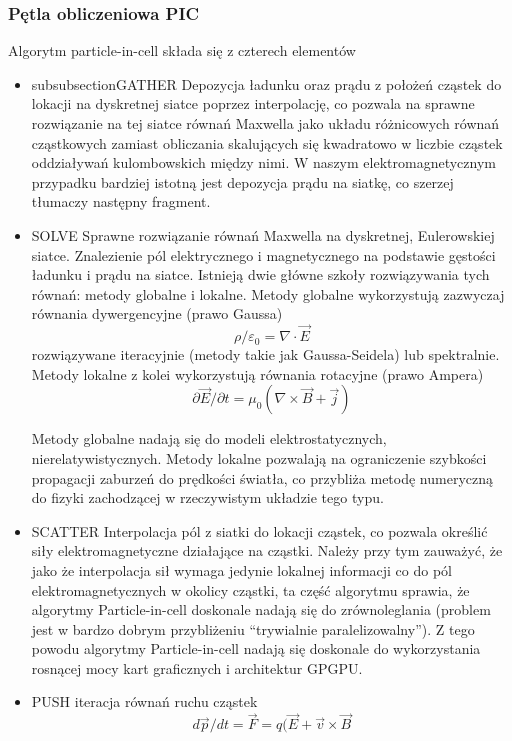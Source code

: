     \subsubsection{Pętla obliczeniowa PIC}
    Algorytm particle-in-cell składa się z czterech elementów 
    \begin{itemize}
        \item subsubsection{GATHER}
    Depozycja ładunku oraz prądu z położeń cząstek do lokacji na dyskretnej siatce poprzez interpolację,
    co pozwala na sprawne rozwiązanie na tej siatce
    równań Maxwella jako układu różnicowych równań cząstkowych zamiast obliczania skalujących się kwadratowo w liczbie cząstek
    oddziaływań kulombowskich między nimi.
    W naszym elektromagnetycznym przypadku bardziej istotną jest depozycja prądu na siatkę, co szerzej tłumaczy następny
    fragment. 
    \item SOLVE
    Sprawne rozwiązanie równań Maxwella na dyskretnej, Eulerowskiej siatce.
    Znalezienie pól elektrycznego i magnetycznego
    na podstawie gęstości ładunku i prądu na siatce.
    Istnieją dwie główne szkoły rozwiązywania tych równań: metody globalne i lokalne. Metody globalne wykorzystują
    zazwyczaj równania dywergencyjne (prawo Gaussa)
    \begin{equation}
        \rho / \varepsilon_0 = \nabla \cdot \vec{E}
        \label{poisson-eq}
    \end{equation}
    rozwiązywane iteracyjnie (metody takie jak Gaussa-Seidela)
    lub spektralnie.
    Metody lokalne z kolei wykorzystują równania rotacyjne (prawo Ampera) 
    \begin{equation}
        \partial \vec{E} / \partial t = \mu_0(\nabla \times \vec{B} + \vec{j})
        \label{FIXME}
    \end{equation}

    Metody globalne nadają się do modeli elektrostatycznych, nierelatywistycznych.
    Metody lokalne pozwalają na ograniczenie szybkości propagacji zaburzeń do prędkości światła, co przybliża
    metodę numeryczną do fizyki zachodzącej w rzeczywistym układzie tego typu.
    \item SCATTER
    Interpolacja pól z siatki do lokacji cząstek, co pozwala określić siły elektromagnetyczne działające na cząstki.
    Należy przy tym zauważyć, że jako że interpolacja sił wymaga jedynie lokalnej informacji co do pól
    elektromagnetycznych w okolicy cząstki, ta część algorytmu sprawia, że algorytmy Particle-in-cell doskonale
    nadają się do zrównoleglania (problem jest w bardzo dobrym przybliżeniu ``trywialnie paralelizowalny''). Z tego powodu algorytmy
    Particle-in-cell nadają się doskonale do wykorzystania rosnącej mocy kart graficznych i architektur GPGPU.
    \item PUSH
    iteracja równań ruchu cząstek
    \begin{equation}
        d \vec{p}/dt = \vec{F} = q (\vec{E} + \vec{v} \times \vec{B}
        \label{eq-of-motion}
    \end{equation}


\end{itemize}
